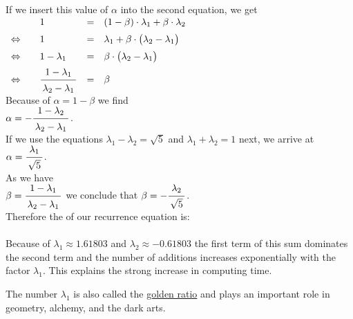 If we insert this value of $\alpha$  into the second equation, we get 
\\[0.2cm]
\hspace*{1.3cm}
$
\begin{array}{clcl}
                      &  1 & = & (1 - \beta)\cdot  \lambda_1 + \beta \cdot \lambda_2 \\[0.2cm]
\Leftrightarrow\quad  &  1 & = & 
 \lambda_1  + \beta \cdot \bigl( \lambda_2 - \lambda_1\bigr) \\[0.2cm]
\Leftrightarrow\quad  &  1 - \lambda_1 & = & \beta \cdot \bigl(\lambda_2 - \lambda_1\bigr)  \\[0.2cm]
\Leftrightarrow\quad  &  \bruch{1 - \lambda_1}{\lambda_2 - \lambda_1} & = & \beta 
\end{array}
$
\\[0.2cm]
Because of $\alpha = 1 - \beta$ we find  \\[0.2cm]
\hspace*{1.3cm} $\alpha = - \bruch{1 - \lambda_2}{\lambda_2 - \lambda_1}$. \\[0.2cm]
If we use the equations $\lambda_1 - \lambda_2 = \sqrt{5}$ and $\lambda_1 + \lambda_2 = 1$ next, we arrive at
\\[0.2cm]
\hspace*{1.3cm} 
$\alpha = \bruch{\lambda_1}{\sqrt{5}} $.
\\[0.2cm]
As we have
\\[0.2cm]
\hspace*{1.3cm}
$\beta =  \bruch{1 - \lambda_1}{\lambda_2 - \lambda_1}$ \quad 
we conclude that \quad
$\beta = -\bruch{\lambda_2}{\sqrt{5}}$. 
\\[0.2cm]
Therefore the  of our recurrence equation is: \\[0.2cm]
\hspace*{1.3cm}
  \colorbox{red}{}
\\[0.2cm]
Because of $\lambda_1\approx 1.61803$ and $\lambda_2 \approx - 0.61803$ the first term
of this sum dominates the second term and the number of additions increases exponentially with the factor $\lambda_1$.
This explains the strong increase in computing time.
\pagebreak

\remark 
The number $\lambda_1$ is also called the \href{https://en.wikipedia.org/wiki/Golden_ratio}{golden ratio} 
and plays an important role in geometry, alchemy, and the dark arts. \eoxs


